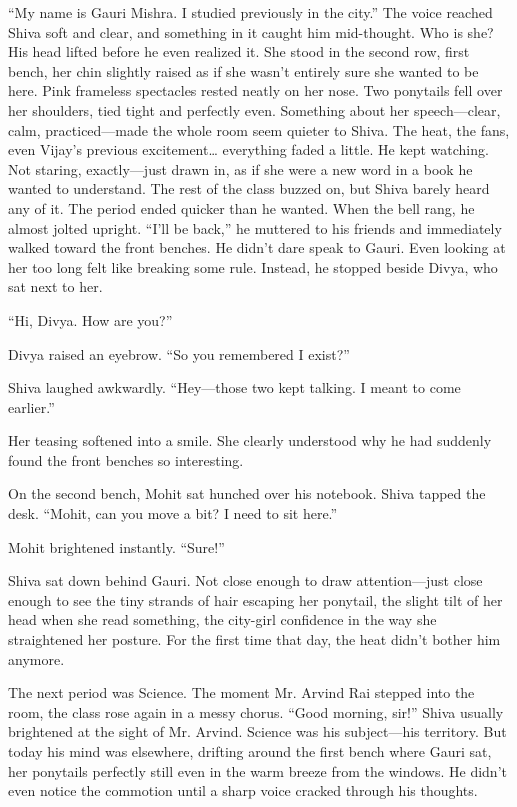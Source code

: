 ``My name is Gauri Mishra. I studied previously in the city.'' The voice reached Shiva soft and clear, and something in it caught him mid-thought. Who is she? His head lifted before he even realized it. She stood in the second row, first bench, her chin slightly raised as if she wasn't entirely sure she wanted to be here. Pink frameless spectacles rested neatly on her nose. Two ponytails fell over her shoulders, tied tight and perfectly even. Something about her speech—clear, calm, practiced—made the whole room seem quieter to Shiva. The heat, the fans, even Vijay's previous excitement… everything faded a little. He kept watching. Not staring, exactly—just drawn in, as if she were a new word in a book he wanted to understand. The rest of the class buzzed on, but Shiva barely heard any of it. The period ended quicker than he wanted. When the bell rang, he almost jolted upright. ``I'll be back,'' he muttered to his friends and immediately walked toward the front benches. He didn't dare speak to Gauri. Even looking at her too long felt like breaking some rule. Instead, he stopped beside Divya, who sat next to her.

``Hi, Divya. How are you?''

Divya raised an eyebrow. ``So you remembered I exist?''

Shiva laughed awkwardly. ``Hey—those two kept talking. I meant to come earlier.''

Her teasing softened into a smile. She clearly understood why he had suddenly found the front benches so interesting.

On the second bench, Mohit sat hunched over his notebook. Shiva tapped the desk. ``Mohit, can you move a bit? I need to sit here.''

Mohit brightened instantly. ``Sure!''

Shiva sat down behind Gauri. Not close enough to draw attention—just close enough to see the tiny strands of hair escaping her ponytail, the slight tilt of her head when she read something, the city-girl confidence in the way she straightened her posture. For the first time that day, the heat didn't bother him anymore.

The next period was Science. The moment Mr. Arvind Rai stepped into the room, the class rose again in a messy chorus. ``Good morning, sir!'' Shiva usually brightened at the sight of Mr. Arvind. Science was his subject—his territory. But today his mind was elsewhere, drifting around the first bench where Gauri sat, her ponytails perfectly still even in the warm breeze from the windows. He didn't even notice the commotion until a sharp voice cracked through his thoughts.

